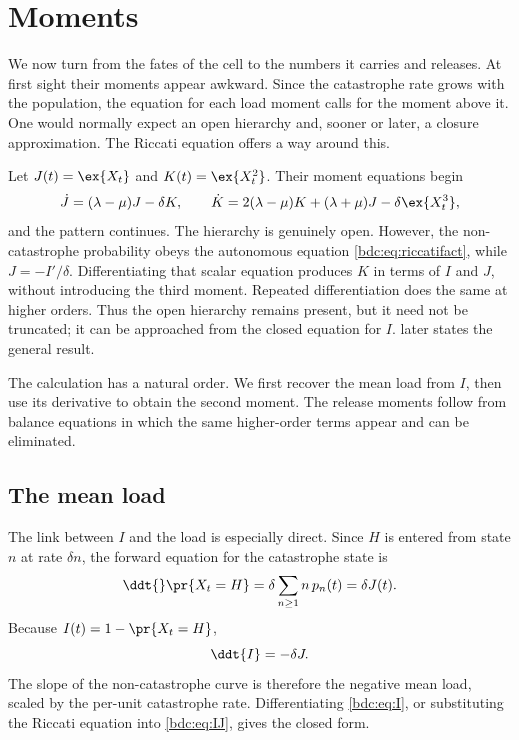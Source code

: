 \section{Moments}
\label{bdc:sec:moments}

We now turn from the fates of the cell to the numbers it carries and releases.
At first sight their moments appear awkward. Since the catastrophe rate grows
with the population, the equation for each load moment calls for the moment
above it. One would normally expect an open hierarchy and, sooner or later, a
closure approximation. The Riccati equation offers a way around this.

\begin{remark}
\label{bdc:rem:closure}
Let $J(t)=\ex{X_t}$ and $K(t)=\ex{X_t^2}$. Their moment equations begin
\[
\dot J=(\lambda-\mu)J-\delta K,
\qquad
\dot K=2(\lambda-\mu)K+(\lambda+\mu)J-\delta\ex{X_t^3},
\]
and the pattern continues. The hierarchy is genuinely open. However, the
non-catastrophe probability obeys the autonomous equation
\cref{bdc:eq:riccatifact}, while $J=-I'/\delta$. Differentiating that scalar
equation produces $K$ in terms of $I$ and $J$, without introducing the third
moment. Repeated differentiation does the same at higher orders. Thus the open
hierarchy remains present, but it need not be truncated; it can be approached
from the closed equation for $I$.  later states the
general result.
\end{remark}

The calculation has a natural order. We first recover the mean load from $I$,
then use its derivative to obtain the second moment. The release moments follow
from balance equations in which the same higher-order terms appear and can be
eliminated.

\subsection{The mean load}
\label{bdc:sec:J}

The link between $I$ and the load is especially direct. Since $H$ is entered
from state $n$ at rate $\delta n$, the forward equation for the catastrophe
state is
\[
\ddt{}\pr{X_t=H}
=\delta\sum_{n\ge1}n\,p_n(t)
=\delta J(t).
\]
Because $I(t)=1-\pr{X_t=H}$,
\begin{equation}
\label{bdc:eq:IJ}
\ddt{I}=-\delta J.
\end{equation}
The slope of the non-catastrophe curve is therefore the negative mean load,
scaled by the per-unit catastrophe rate. Differentiating \cref{bdc:eq:I}, or
substituting the Riccati equation into \cref{bdc:eq:IJ}, gives the closed form.

